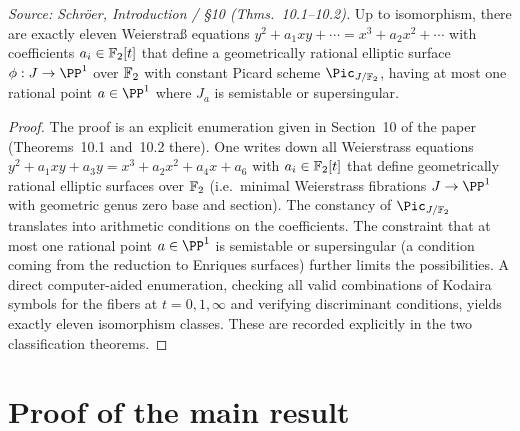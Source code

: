 \begin{theorem}
  \label{thm:classification-weierstrass}
  \textit{Source: Schr\"oer, Introduction / §10 (Thms.~10.1--10.2).}
  Up to isomorphism, there are exactly eleven Weierstra\ss{} equations
  \(y^2 + a_1 x y + \cdots = x^3 + a_2 x^2 + \cdots\) with coefficients \(a_i \in \mathbb{F}_2[t]\)
  that define a geometrically rational elliptic surface \(\phi : J \to \PP^1\)
  over \(\mathbb{F}_2\) with constant Picard scheme \(\Pic_{J/\FF_2}\),
  having at most one rational point \(a \in \PP^1\) where \(J_a\) is semistable or supersingular.
\end{theorem}
\begin{proof}
  The proof is an explicit enumeration given in Section~10 of the paper (Theorems~10.1 and~10.2 there).
  One writes down all Weierstrass equations \(y^2 + a_1 x y + a_3 y = x^3 + a_2 x^2 + a_4 x + a_6\)
  with \(a_i \in \mathbb{F}_2[t]\) that define geometrically rational elliptic surfaces over \(\mathbb{F}_2\)
  (i.e.\ minimal Weierstrass fibrations \(J \to \PP^1\) with geometric genus zero base and section).
  The constancy of \(\Pic_{J/\FF_2}\) translates into arithmetic conditions on the coefficients.
  The constraint that at most one rational point \(a \in \PP^1\) is semistable or supersingular
  (a condition coming from the reduction to Enriques surfaces) further limits the possibilities.
  A direct computer-aided enumeration, checking all valid combinations of
  Kodaira symbols for the fibers at \(t = 0, 1, \infty\) and verifying discriminant conditions,
  yields exactly eleven isomorphism classes.
  These are recorded explicitly in the two classification theorems.
\end{proof}

\section{Proof of the main result}

